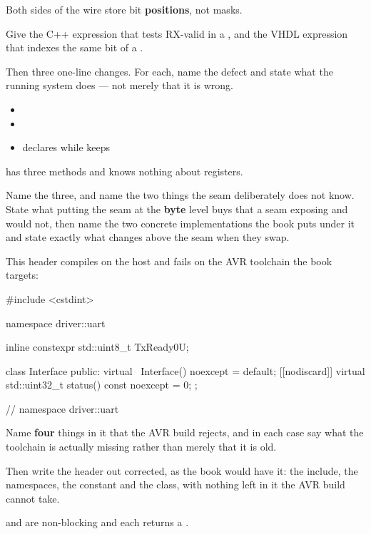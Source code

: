  Both sides of the wire store bit \textbf{positions}, not masks.

Give the C++ expression that tests RX-valid in a , and the VHDL expression
that indexes the same bit of a .

Then three one-line changes. For each, name the defect and state what the running system does ---
not merely that it is wrong.
\begin{itemize}
  \item {}
  \item {}
  \item {} declares  while
     keeps 
\end{itemize}

  has three methods and knows nothing about registers.

Name the three, and name the two things the seam deliberately does not know. State what putting the
seam at the \textbf{byte} level buys that a seam exposing  and  would
not, then name the two concrete implementations the book puts under it and state exactly what
changes above the seam when they swap. 

 This header compiles on the host and fails on the AVR toolchain the book targets:

\begin{cppcode}
#include <cstdint>

namespace driver::uart
{
inline constexpr std::uint8_t TxReady{0U};

class Interface
{
public:
    virtual ~Interface() noexcept = default;
    [[nodiscard]] virtual std::uint32_t status() const noexcept = 0;
};
} // namespace driver::uart
\end{cppcode}

\noindent Name \textbf{four} things in it that the AVR build rejects, and in each case say what the
toolchain is actually missing rather than merely that it is old.

Then write the header out corrected, as the book would have it: the include, the namespaces, the
constant and the class, with nothing left in it the AVR build cannot take. 

  and  are non-blocking and each returns a .

